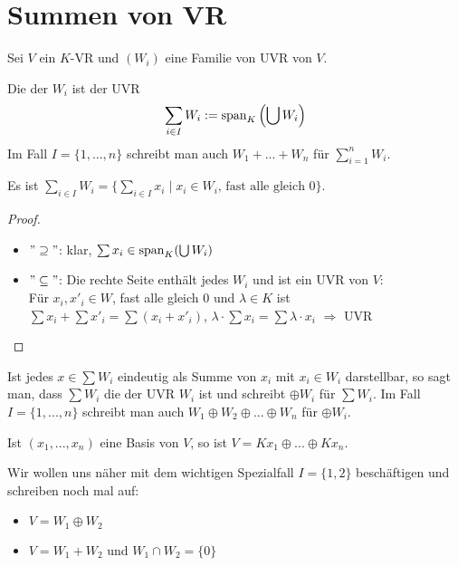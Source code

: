 \section{Summen von VR}

Sei $V$ ein $K$-VR und $(W_i)$ eine Familie von UVR von $V$.

\begin{definition}
	Die  der $W_i$ ist der UVR
	\begin{align}
		\sum_{i\in I} W_i := \operatorname{span}_K\left(\bigcup W_i\right)\notag
	\end{align} 
	Im Fall $I=\{1,...,n\}$ schreibt man auch $W_1+...+W_n$ für $\sum_{i=1}^n W_i$. 
\end{definition}

\begin{lemma}
	Es ist $\sum_{i\in I} W_i = \{\sum_{i\in I} x_i \mid x_i\in W_i\text{, fast alle 
		gleich 0}\}$. 
\end{lemma}
\begin{proof}
	\begin{itemize}
		\item $"\supseteq"$: klar, $\sum x_i \in \operatorname{span}_K(\bigcup W_i)$
		\item $"\subseteq"$: Die rechte Seite enthält jedes $W_i$ und ist ein UVR von $V$: \\
		Für $x_i,x'_i \in W$, fast alle gleich 0 und $\lambda \in K$ ist $\sum x_i + \sum x'_i = \sum (x_i+x'_i)$, $\lambda
		\cdot \sum x_i = \sum \lambda\cdot x_i$ $\Rightarrow$ UVR
	\end{itemize}
\end{proof}

\begin{definition}
	Ist jedes $x\in \sum W_i$ eindeutig als Summe von $x_i$ mit $x_i\in W_i$ 
	darstellbar, so sagt man, dass $\sum W_i$ die  der UVR $W_i$ ist und schreibt $\oplus W_i$ für 
	$\sum W_i$. Im Fall $I=\{1,...,n\}$ schreibt man auch $W_1\oplus W_2 \oplus ... \oplus W_n$ für $\oplus W_i$.
\end{definition}

\begin{example}
	Ist $(x_1,...,x_n)$ eine Basis von $V$, so ist $V=Kx_1\oplus ... \oplus Kx_n$. 
\end{example}

\begin{remark}
	Wir wollen uns näher mit dem wichtigen Spezialfall $I=\{1,2\}$ beschäftigen und schreiben noch 
	mal auf: 
	\begin{itemize}
		\item $V=W_1\oplus W_2$
		\item $V=W_1 + W_2$ und $W_1 \cap W_2 = \{0\}$
	\end{itemize}
\end{remark}


